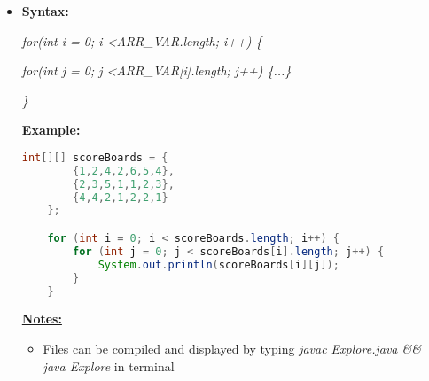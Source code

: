 \documentclass[12pt]{article}
\begin{document}
\bigskip

\begin{itemize}
    \item \textbf{Syntax:}

    \textit{for(int i = 0; i \textless ARR\_VAR.length; i++) \{}

    \textit{    for(int j = 0; j \textless ARR\_VAR[i].length; j++) \{...\}}

    \textit{\}}

    \bigskip

    \underline{\textbf{Example:}}

    \bigskip

    \begin{lstlisting}[language=Java, caption={lesson\_07/Explore.java}]
    int[][] scoreBoards = {
        {1,2,4,2,6,5,4},
        {2,3,5,1,1,2,3},
        {4,4,2,1,2,2,1}
    };

    for (int i = 0; i < scoreBoards.length; i++) {
        for (int j = 0; j < scoreBoards[i].length; j++) {
            System.out.println(scoreBoards[i][j]);
        }
    }
    \end{lstlisting}

    \underline{\textbf{Notes:}}

    \bigskip

    \begin{itemize}
        \item Files can be compiled and displayed by typing \textit{javac Explore.java \&\& java Explore}
        in terminal
    \end{itemize}
\end{itemize}
\end{document}
